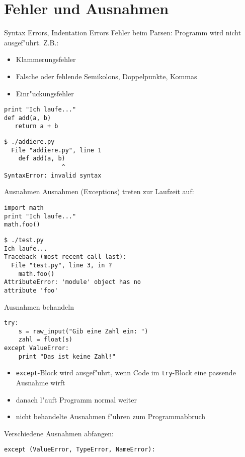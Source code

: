\section{Fehler und Ausnahmen}

\begin{frame}[fragile]{Syntax Errors, Indentation Errors}
Fehler beim Parsen: \alert{Programm wird nicht ausgef"uhrt}. Z.B.: 
\begin{itemize}
\item Klammerungsfehler
\item Falsche oder fehlende Semikolons, Doppelpunkte, Kommas
\item Einr"uckungsfehler
\end{itemize}
\begin{lstlisting}[style=Python]
print "Ich laufe..."
def add(a, b)
   return a + b
\end{lstlisting}
\begin{lstlisting}[style=Shell]
$ ./addiere.py
  File "addiere.py", line 1
    def add(a, b)
                ^
SyntaxError: invalid syntax
\end{lstlisting} %
\end{frame}

\begin{frame}[fragile]{Ausnahmen}
Ausnahmen (Exceptions) treten \alert{zur Laufzeit} auf:
\begin{lstlisting}[style=Python]
import math
print "Ich laufe..."
math.foo()
\end{lstlisting}
\begin{lstlisting}[style=Shell]
$ ./test.py
Ich laufe...
Traceback (most recent call last):
  File "test.py", line 3, in ?
    math.foo()
AttributeError: 'module' object has no 
attribute 'foo'
\end{lstlisting} %
\end{frame}

\begin{frame}[fragile]{Ausnahmen behandeln}
\begin{lstlisting}[style=Python]
try:
    s = raw_input("Gib eine Zahl ein: ")
    zahl = float(s)
except ValueError:
    print "Das ist keine Zahl!"
\end{lstlisting}
\begin{itemize}
\item \lstinline{except}-Block wird ausgef"uhrt, wenn Code im \lstinline{try}-Block eine passende Ausnahme wirft
\item danach l"auft Programm normal weiter
\item nicht behandelte Ausnahmen f"uhren zum Programmabbruch
\end{itemize}
Verschiedene Ausnahmen abfangen:
\begin{lstlisting}[style=Python]
except (ValueError, TypeError, NameError):
\end{lstlisting}
\end{frame}


